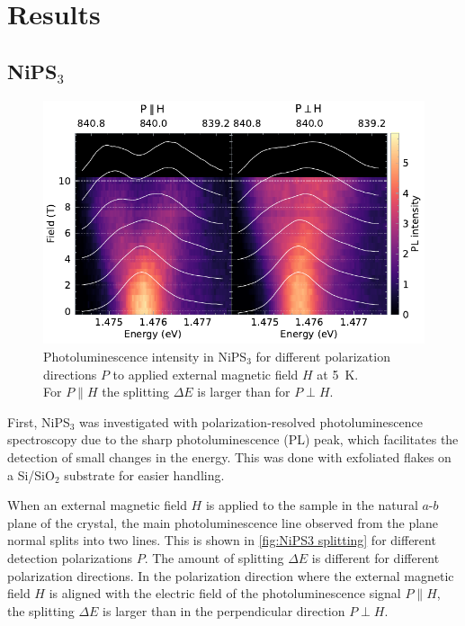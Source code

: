 \documentclass[
	twoside,
	parskip=half,
	a4paper,
]{scrbook}
\begin{document}
\chapter{Results}

\section{NiPS$_3$}
\begin{figure}
	\centering
	\includegraphics{../figures/2024-04-10 NiPS4 splitting.pdf}
	\caption{
		Photoluminescence intensity in NiPS$_3$ for different polarization directions $P$ to applied external magnetic field $H$ at \SI{5}{K}.\\
		For $P\parallel H$ the splitting $\Delta E$ is larger than for $P\perp H$.
	}
	\label{fig:NiPS3 splitting}
\end{figure}
First, NiPS$_3$ was investigated with polarization-resolved photoluminescence spectroscopy due to the sharp photoluminescence (PL) peak, which facilitates the detection of small changes in the energy.
This was done with exfoliated flakes on a Si/SiO$_2$ substrate for easier handling.

When an external magnetic field $H$ is applied to the sample in the natural $a$-$b$ plane of the crystal, the main photoluminescence line observed from the plane normal splits into two lines.
This is shown in \autoref{fig:NiPS3 splitting} for different detection polarizations $P$.
The amount of splitting $\Delta E$ is different for different polarization directions.
In the polarization direction where the external magnetic field $H$ is aligned with the electric field of the photoluminescence signal $P\parallel H$, the splitting $\Delta E$ is larger than in the perpendicular direction $P\perp H$.
\end{document}
